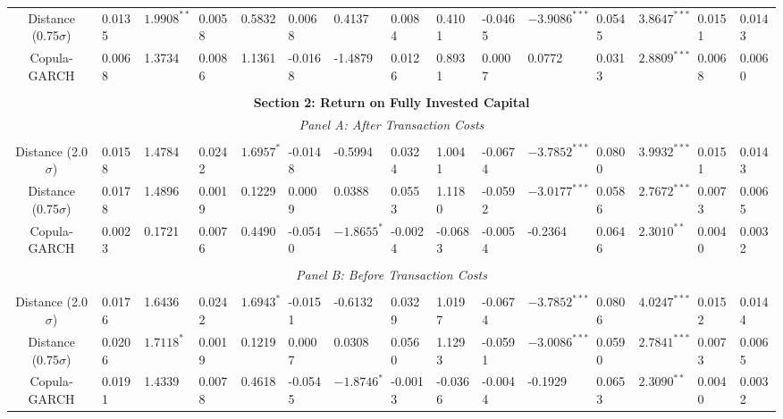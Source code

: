 \documentclass[a4paper]{article}
\begin{document}
\begin{sidewaystable}
\begin{threeparttable}[H]
\begin{tabularx}{\textwidth}{@{\extracolsep{\fill}}lllllllllllllll@{}}
			\multicolumn{1}{c}{Distance (0.75$\sigma$)} & 0.0135 & $1.9908^{**}$ & 0.0058 & 0.5832 & 0.0068 & 0.4137 & 0.0084 & 0.4101 & -0.0465 & $-3.9086^{***}$ & 0.0545 & $3.8647^{***}$ & 0.0151 & 0.0143 \\
			\multicolumn{1}{c}{Copula-GARCH} & 0.0068 & 1.3734 & 0.0086 & 1.1361 & -0.0168 & -1.4879 & 0.0126 & 0.8931 & 0.0007 & 0.0772 & 0.0313 & $2.8809^{***}$ & 0.0068 & 0.0060 \\
			&       &       &       &       &       &       &       &       &       &       &       &       &       &  \\
			\midrule
			\multicolumn{15}{c}{\textbf{Section 2: Return on Fully Invested Capital}} \\
			\multicolumn{15}{c}{\textit{Panel A: After Transaction Costs}} \\
			&       &       &       &       &       &       &       &       &       &       &       &       &       &  \\
			\multicolumn{1}{c}{Distance (2.0$\sigma$)} & 0.0158 & 1.4784 & 0.0242 & $1.6957^{*}$ & -0.0148 & -0.5994 & 0.0324 & 1.0041 & -0.0674 & $-3.7852^{***}$ & 0.0800 & $3.9932^{***}$ & 0.0151 & 0.0143 \\
			\multicolumn{1}{c}{Distance (0.75$\sigma$)} & 0.0178 & 1.4896 & 0.0019 & 0.1229 & 0.0009 & 0.0388 & 0.0553 & 1.1180 & -0.0592 & $-3.0177^{***}$ & 0.0586 & $2.7672^{***}$ & 0.0073 & 0.0065 \\
			\multicolumn{1}{c}{Copula-GARCH} & 0.0023 & 0.1721 & 0.0076 & 0.4490 & -0.0540 & $-1.8655^{*}$ & -0.0024 & -0.0683 & -0.0054 & -0.2364 & 0.0646 & $2.3010^{**}$ & 0.0040 & 0.0032 \\
			&       &       &       &       &       &       &       &       &       &       &       &       &       &  \\
			\multicolumn{15}{c}{\textit{Panel B: Before Transaction Costs}} \\
			&       &       &       &       &       &       &       &       &       &       &       &       &       &  \\
			\multicolumn{1}{c}{Distance (2.0$\sigma$)} & 0.0176 & 1.6436 & 0.0242 & $1.6943^{*}$ & -0.0151 & -0.6132 & 0.0329 & 1.0197 & -0.0674 & $-3.7852^{***}$ & 0.0806 & $4.0247^{***}$ & 0.0152 & 0.0144 \\
			\multicolumn{1}{c}{Distance (0.75$\sigma$)} & 0.0206 & $1.7118^{*}$ & 0.0019 & 0.1219 & 0.0007 & 0.0308 & 0.0560 & 1.1293 & -0.0591 & $-3.0086^{***}$ & 0.0590 & $2.7841^{***}$ & 0.0073 & 0.0065 \\
			\multicolumn{1}{c}{Copula-GARCH} & 0.0191 & 1.4339 & 0.0078 & 0.4618 & -0.0545 & $-1.8746^{*}$ & -0.0013 & -0.0366 & -0.0044 & -0.1929 & 0.0653 & $2.3090^{**}$ & 0.0040 & 0.0032 \\

\end{tabularx}
\end{threeparttable}
\end{sidewaystable}
\end{document}
